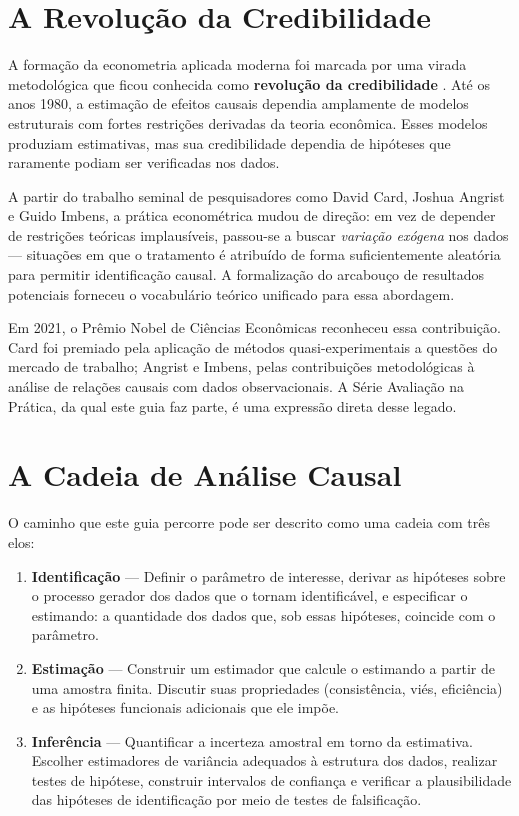 \section{A Revolução da Credibilidade}

A formação da econometria aplicada moderna foi marcada por uma virada
metodológica que ficou conhecida como \textbf{revolução da credibilidade}
\citep{Angrist2010}. Até os anos 1980, a estimação de efeitos causais dependia
amplamente de modelos estruturais com fortes restrições derivadas da teoria
econômica. Esses modelos produziam estimativas, mas sua credibilidade dependia
de hipóteses que raramente podiam ser verificadas nos dados.

A partir do trabalho seminal de pesquisadores como David Card, Joshua Angrist e
Guido Imbens, a prática econométrica mudou de direção: em vez de depender de
restrições teóricas implausíveis, passou-se a buscar \textit{variação exógena}
nos dados --- situações em que o tratamento é atribuído de forma suficientemente
aleatória para permitir identificação causal. A formalização do arcabouço de
resultados potenciais \citep{Rubin1974, Rubin1978, Neyman1923} forneceu o
vocabulário teórico unificado para essa abordagem.

Em 2021, o Prêmio Nobel de Ciências Econômicas reconheceu essa contribuição.
Card foi premiado pela aplicação de métodos quasi-experimentais a questões do
mercado de trabalho; Angrist e Imbens, pelas contribuições metodológicas à
análise de relações causais com dados observacionais. A Série Avaliação na
Prática, da qual este guia faz parte, é uma expressão direta desse legado.


\section{A Cadeia de Análise Causal}

O caminho que este guia percorre pode ser descrito como uma cadeia com
três elos:

\begin{enumerate}[leftmargin=*, label=\textbf{\arabic*.}]
  \item \textbf{Identificação} — Definir o parâmetro de interesse, derivar as
    hipóteses sobre o processo gerador dos dados que o tornam identificável, e
    especificar o estimando: a quantidade dos dados que, sob essas hipóteses,
    coincide com o parâmetro.

  \item \textbf{Estimação} — Construir um estimador que calcule o estimando a
    partir de uma amostra finita. Discutir suas propriedades (consistência,
    viés, eficiência) e as hipóteses funcionais adicionais que ele impõe.

  \item \textbf{Inferência} — Quantificar a incerteza amostral em torno da
    estimativa. Escolher estimadores de variância adequados à estrutura dos
    dados, realizar testes de hipótese, construir intervalos de confiança e
    verificar a plausibilidade das hipóteses de identificação por meio de
    testes de falsificação.
\end{enumerate}


